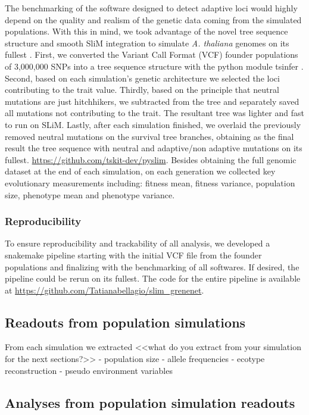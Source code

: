 \documentclass{article}
\begin{document}
The benchmarking of the software designed to detect adaptive loci would highly depend on the quality and realism of the genetic data coming from the simulated populations. With this in mind, we took advantage of the novel tree sequence structure and smooth SliM integration to simulate \textit{A. thaliana} genomes on its fullest \citep{Kelleher2018-jb, Haller2019-lm}. First, we converted the Variant Call Format (VCF) founder populations of 3,000,000 SNPs  into a tree sequence structure with the python module tsinfer \citep{Kelleher2019-ev}. Second, based on each simulation's genetic architecture we selected the loci contributing to the trait value. Thirdly, based on the principle that neutral mutations are just hitchhikers, we subtracted from the tree and separately saved all mutations not contributing to the trait. The resultant tree was lighter and fast to run on SLiM. Lastly, after each simulation finished, we overlaid the previously removed neutral mutations on the survival tree branches, obtaining as the final result the tree sequence with neutral and adaptive/non adaptive mutations on its fullest. 
\url{https://github.com/tskit-dev/pyslim}. Besides obtaining the full genomic dataset at the end of each simulation, on each generation we collected key evolutionary measurements including: fitness mean, fitness variance, population size, phenotype mean and phenotype variance. 

\subsubsection{Reproducibility}
To ensure reproducibility and trackability of all analysis, we developed a snakemake pipeline \citep{Molder2021-ho}  starting with the initial VCF file from the founder populations and finalizing with the benchmarking of all softwares. If desired, the pipeline could be rerun on its fullest. The code for the entire pipeline is available at \url{https://github.com/Tatianabellagio/slim_grenenet}.

\subsection{Readouts from population simulations}

From each simulation we extracted <<what do you extract from your simulation for the next sections?>>
- population size
- allele frequencies
- ecotype reconstruction
- pseudo environment variables


\subsection{Analyses from population simulation readouts}
\end{document}
